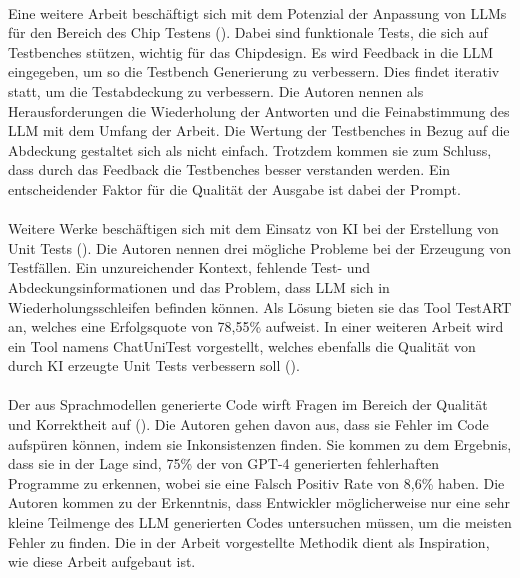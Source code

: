 \documentclass[12pt,toc=bib,toc=listof]{scrreprt}
\begin{document}
\\
Eine weitere Arbeit beschäftigt sich mit dem Potenzial der Anpassung von LLMs für den Bereich des Chip Testens (\cite{Bhandari2024}). Dabei sind funktionale Tests, die sich auf Testbenches stützen, wichtig für das Chipdesign. Es wird Feedback in die LLM eingegeben, um so die Testbench Generierung zu verbessern. Dies findet iterativ statt, um die Testabdeckung zu verbessern. Die Autoren nennen als Herausforderungen die Wiederholung der Antworten und die Feinabstimmung des LLM mit dem Umfang der Arbeit. Die Wertung der Testbenches in Bezug auf die Abdeckung gestaltet sich als nicht einfach. Trotzdem kommen sie zum Schluss, dass durch das Feedback die Testbenches besser verstanden werden. Ein entscheidender Faktor für die Qualität der Ausgabe ist dabei der Prompt.\\
\\
Weitere Werke beschäftigen sich mit dem Einsatz von KI bei der Erstellung von Unit Tests (\cite{Gu2024}). Die Autoren nennen drei mögliche Probleme bei der Erzeugung von Testfällen. 
Ein unzureichender Kontext, fehlende Test- und Abdeckungsinformationen und das Problem, dass LLM sich in Wiederholungsschleifen befinden können. Als Lösung bieten sie das Tool TestART an, welches eine Erfolgsquote von 78,55\% aufweist. In einer weiteren Arbeit wird ein Tool namens ChatUniTest vorgestellt, welches ebenfalls die Qualität von durch KI erzeugte Unit Tests verbessern soll (\cite{Chen2024}).\\
\\
Der aus Sprachmodellen generierte Code wirft Fragen im Bereich der Qualität und Korrektheit auf (\cite{Wang2024}). Die Autoren  gehen davon aus, dass sie Fehler im Code aufspüren können, indem sie Inkonsistenzen finden. Sie kommen zu dem Ergebnis, dass sie in der Lage sind, 75\% der von GPT-4 generierten fehlerhaften Programme zu erkennen, wobei sie eine Falsch Positiv Rate von 8,6\% haben. Die Autoren kommen zu der Erkenntnis, dass Entwickler möglicherweise nur eine sehr kleine Teilmenge des LLM generierten Codes untersuchen müssen, um die meisten Fehler zu finden. Die in der Arbeit vorgestellte Methodik dient als Inspiration, wie diese Arbeit aufgebaut ist.
\end{document}
